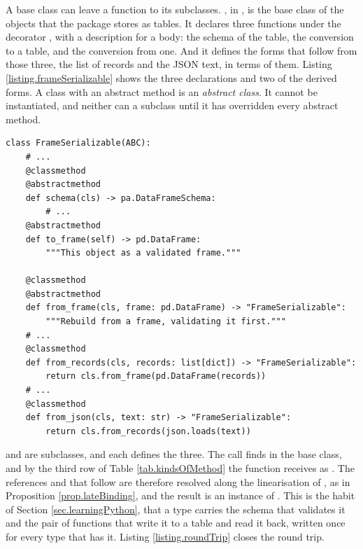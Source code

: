 A base class can leave a function to its subclasses.
, in ,
is the base class of the objects that the package stores as tables.
It declares three functions under the decorator ,
with a description for a body:
the schema of the table, the conversion to a table, and the conversion from one.
And it defines the forms that follow from those three,
the list of records and the JSON text, in terms of them.
Listing \ref{listing.frameSerializable} shows the three declarations
and two of the derived forms.
A class with an abstract method is an \emph{abstract class}.
It cannot be instantiated,
and neither can a subclass until it has overridden every abstract method.

\begin{lstlisting}[caption={\protect\codehl{unito26.lob.frames.FrameSerializable}, abridged: three declarations, and two of the forms derived from them.}, label=listing.frameSerializable]
class FrameSerializable(ABC):
    # ...
    @classmethod
    @abstractmethod
    def schema(cls) -> pa.DataFrameSchema:
        # ...
    @abstractmethod
    def to_frame(self) -> pd.DataFrame:
        """This object as a validated frame."""

    @classmethod
    @abstractmethod
    def from_frame(cls, frame: pd.DataFrame) -> "FrameSerializable":
        """Rebuild from a frame, validating it first."""
    # ...
    @classmethod
    def from_records(cls, records: list[dict]) -> "FrameSerializable":
        return cls.from_frame(pd.DataFrame(records))
    # ...
    @classmethod
    def from_json(cls, text: str) -> "FrameSerializable":
        return cls.from_records(json.loads(text))
\end{lstlisting}

 and  are subclasses, and each defines the three.
The call  finds  in the base class,
and by the third row of Table \ref{tab.kindsOfMethod} the function receives
 as .
The references  and  that follow
are therefore resolved along the linearisation of ,
as in Proposition \ref{prop.lateBinding},
and the result is an instance of .
This is the habit of Section \ref{sec.learningPython},
that a type carries the schema that validates it
and the pair of functions that write it to a table and read it back,
written once for every type that has it.
Listing \ref{listing.roundTrip} closes the round trip.

